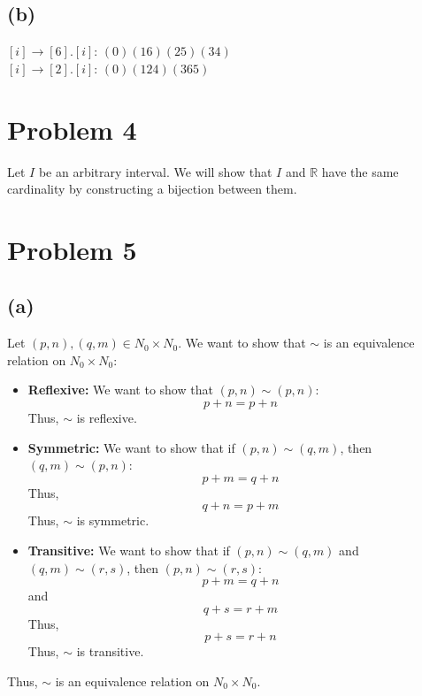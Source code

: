 \documentclass{article}
\begin{document}
\subsection*{(b)}
\([i] \rightarrow [6].[i]\):
\(
   (0)(16)(25)(34)
\)
\\
\([i] \rightarrow [2].[i]\):
\(
   (0)(124)(365)
\)

\section*{Problem 4}


Let \(I\) be an arbitrary interval. We will show that \(I\) and \(\mathbb{R}\) have the same cardinality by constructing a bijection between them.


\section*{Problem 5}


\subsection*{(a)}
Let \((p, n), (q, m) \in N_0 \times N_0\). We want to show that \(\sim\) is an equivalence relation on \(N_0 \times N_0\):
\begin{itemize}
   \item \textbf{Reflexive:} We want to show that \((p, n) \sim (p, n)\):
   \[
      p + n = p + n
   \]
   Thus, \(\sim\) is reflexive.
   \item \textbf{Symmetric:} We want to show that if \((p, n) \sim (q, m)\), then \((q, m) \sim (p, n)\):
   \[
      p + m = q + n
   \]
   Thus,
   \[
      q + n = p + m
   \]
   Thus, \(\sim\) is symmetric.
   \item \textbf{Transitive:} We want to show that if \((p, n) \sim (q, m)\) and \((q, m) \sim (r, s)\), then \((p, n) \sim (r, s)\):
   \[
      p + m = q + n
   \]
   and
   \[
      q + s = r + m
   \]
   Thus,
   \[
      p + s = r + n
   \]
   Thus, \(\sim\) is transitive.
\end{itemize}
Thus, \(\sim\) is an equivalence relation on \(N_0 \times N_0\).
\end{document}

